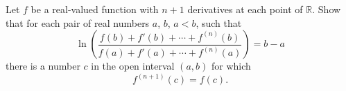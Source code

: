 Let \(f\) be a real-valued function with \(n+1\) derivatives at each point of \(\mathbb R\). Show that for each pair of real numbers \(a\), \(b\), \(a<b\), such that
\[
    \ln\left( \frac{f(b)+f'(b) + \cdots + f^{(n)} (b)}{f(a) + f'(a) + \cdots + f^{(n)}(a)}\right) = b-a
\]
there is a number \(c\) in the open interval \((a,b)\) for which
\[
    f^{(n+1)}(c) = f(c).
\]